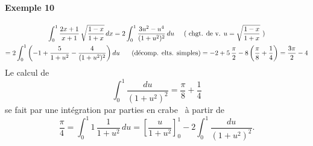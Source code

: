 \paragraph{Exemple 10}
\begin{multline*}
\int_0^1 \frac{2x+1}{x+1}\, \sqrt{\frac{1-x}{1+x}}\, dx 
= 2 \int_0^1 \frac{3u^2 -u^4}{(1+u^2)^2}\, du \hspace{0.5cm} \text{( chgt. de v. } u=\sqrt{\frac{1-x}{1+x}} \text{ )}\\
= 2\int_{0}^{1}\left( -1 + \frac{5}{1+u^2} - \frac{4}{(1+u^2)^2}\right)du  \hspace{0.5cm} \text{ (décomp. elts. simples)}
= -2 + 5\,\frac{\pi}{2} -8\left( \frac{\pi}{8} + \frac{1}{4}\right) =  \frac{3\pi}{2} - 4
\end{multline*}
Le calcul de 
\begin{displaymath}
  \int_{0}^{1}\frac{du}{(1+u^2)^2} = \frac{\pi}{8} + \frac{1}{4}
\end{displaymath}
se fait par une intégration par parties \og en crabe\fg~  à partir de 
\begin{displaymath}
  \frac{\pi}{4} = \int_0^1 1\,\frac{1}{1+u^2} \, du = \left[ \frac{u}{1+u^2}\right]_{0}^{1} 
  -2 \int_{0}^{1}\frac{du}{(1+u^2)^2}.
\end{displaymath}

